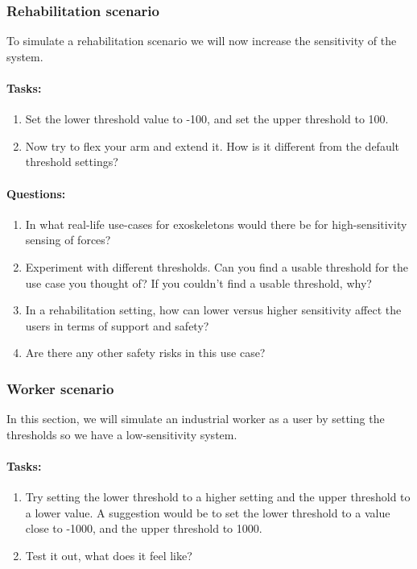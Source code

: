 \subsubsection{Rehabilitation scenario}
To simulate a rehabilitation scenario we will now increase the sensitivity of the system. 

\paragraph{Tasks:}
\begin{enumerate}[]
	\item Set the lower threshold value to -100, and set the upper threshold to 100.
	\item Now try to flex your arm and extend it. How is it different from the default threshold settings? 
\end{enumerate}

\paragraph{Questions:} 
\begin{enumerate}[]
	\item In what real-life use-cases for exoskeletons would there be for high-sensitivity sensing of forces?
	\item Experiment with different thresholds. Can you find a usable threshold for the use case you thought of? If you couldn’t find a usable threshold, why? 
	\item In a rehabilitation setting, how can lower versus higher sensitivity affect the users in terms of support and safety?
	\item Are there any other safety risks in this use case?
\end{enumerate}

\subsubsection{Worker scenario}
In this section, we will simulate an industrial worker as a user by setting the thresholds so we have a low-sensitivity system. 

\paragraph{Tasks:}
\begin{enumerate}[]
	\item Try setting the lower threshold to a higher setting and the upper threshold to a lower value. A suggestion would be to set the lower threshold to a value close to -1000, and the upper threshold to 1000.
	\item Test it out, what does it feel like? 
\end{enumerate}	

